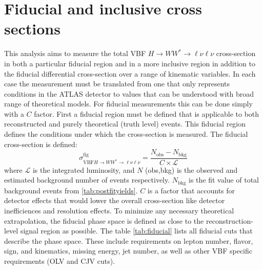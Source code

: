 \section{Fiducial and inclusive cross sections}
This analysis aims to measure the total VBF $H\rightarrow WW^*\rightarrow\ell\nu\ell\nu$ cross-section in both a particular fiducial region and in a more inclusive region in addition to the fiducial differential cross-section over a range of kinematic variables. In each case the measurement must be translated from one that only represents conditions in the ATLAS detector to values that can be understood with broad range of theoretical models. For fiducial measurements this can be done simply with a $C$ factor. First a fiducial region must be defined that is applicable to both reconstructed and purely theoretical (truth level) events. This fiducial region defines the conditions under which the cross-section is measured. The fiducial cross-section is defined:
\begin{equation}
\sigma_{\text{VBF}H\rightarrow WW^*\rightarrow\ell\nu\ell\nu}^{\text{fig}} = \frac{N_{\text{obs}}-N_{\text{bkg}}}{C\times\mathcal{L}}
\end{equation} 
where $\mathcal{L}$ is the integrated luminosity, and $N$ (obs,bkg) is the observed and estimated background number of events respectively. $N_{\text{bkg}}$ is the fit value of total background events from \ref{tab:postfityields}. $C$ is a factor that accounts for detector effects that would lower the overall cross-section like detector inefficiences and resolution effects. To minimize any necessary theoretical extrapolation, the fiducial phase space is defined as close to the reconstruction-level signal region as possible. The table \ref{tab:fiducial} lists all fiducial cuts that describe the phase space. These include requirements on lepton number, flavor, sign, and kinematics, missing energy, jet number, as well as other VBF specific requirements (OLV and CJV cuts). 
